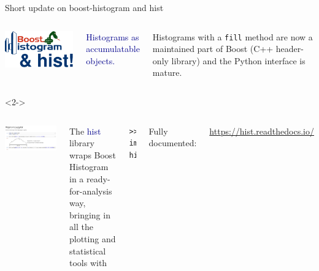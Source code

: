 \documentclass[aspectratio=169]{beamer}
\begin{document}
\begin{frame}[fragile]{Short update on boost-histogram and hist}
\large
\vspace{0.5 cm}
\begin{columns}
\hfill \includegraphics[width=0.9\linewidth]{logo-hist.pdf}

\textcolor{darkblue}{\Large Histograms as accumulatable objects.}

\vspace{0.25 cm}
Histograms with a \texttt{fill} method are now a maintained part of Boost (C++ header-only library) and the Python interface is mature.

\end{columns}

\vspace{0.75 cm}
\begin{uncoverenv}<2->
\begin{columns}
\includegraphics[width=\linewidth]{hist-docs.png}

The \textcolor{darkblue}{hist} library wraps Boost Histogram in a ready-for-analysis way, bringing in all the plotting and statistical tools with

\vspace{0.25 cm}
\begin{verbatim}
>>> import hist
\end{verbatim}

\vspace{0.25 cm}
Fully documented:

\textcolor{blue}{\small \url{https://hist.readthedocs.io/}}
\end{columns}
\end{uncoverenv}
\end{frame}
\end{document}
